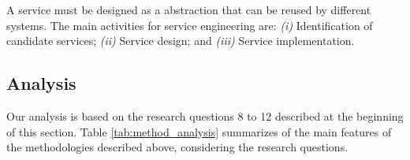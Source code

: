 

A service must be designed as a abstraction that can be reused by different
systems. The main activities for service engineering are: \textit{(i)}
Identification of candidate services; \textit{(ii)} Service design; and
\textit{(iii)} Service implementation.




\subsection{Analysis}
\label{sec:methodology_analisys}

Our analysis is based on the research questions 8 to 12  described at the
beginning of this section. Table \ref{tab:method_analysis}
summarizes of the main features of the methodologies described above,
considering the research questions.


